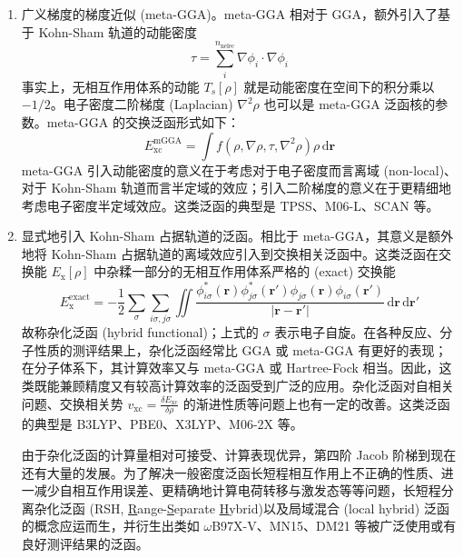 \begin{enumerate}[nosep]
  \item 广义梯度的梯度近似 (meta-GGA)。meta-GGA 相对于 GGA，额外引入了基于 Kohn-Sham 轨道的动能密度
  \begin{equation*}
    \tau = \sum_i^{n_\mathrm{nelec}} \nabla \phi_i \cdot \nabla \phi_i
  \end{equation*}
  事实上，无相互作用体系的动能 $T_s[\rho]$ 就是动能密度在空间下的积分乘以 $-1/2$。电子密度二阶梯度 (Laplacian) $\nabla^2 \rho$ 也可以是 meta-GGA 泛函核的参数。meta-GGA 的交换泛函形式如下：
  \begin{equation}
    E_\mathrm{xc}^\mathrm{mGGA} = \int f(\rho, \nabla \rho, \tau, \nabla^2 \rho) \rho \, \mathrm{d} \bm{r}
  \end{equation}
  meta-GGA 引入动能密度的意义在于考虑对于电子密度而言离域 (non-local)、对于 Kohn-Sham 轨道而言半定域的效应；引入二阶梯度的意义在于更精细地考虑电子密度半定域效应。这类泛函的典型是 TPSS\cite{Tao-Scuseria.PRL.2003, Perdew-Scuseria.JCP.2004}、M06-L\cite{Zhao-Truhlar.TCA.2008}、SCAN\cite{Sun-Perdew.PRL.2015} 等。

  \item 显式地引入 Kohn-Sham 占据轨道的泛函。相比于 meta-GGA，其意义是额外地将 Kohn-Sham 占据轨道的离域效应引入到交换相关泛函中。这类泛函在交换能 $E_\mathrm{x} [\rho]$ 中杂糅一部分的无相互作用体系严格的 (exact) 交换能
  \begin{equation}
    E_\mathrm{x}^\mathrm{exact} = - \frac{1}{2} \sum_\sigma \sum_{i\sigma, j\sigma} \iint \frac{\phi_{i\sigma}^* (\bm{r}) \phi_{j\sigma}^* (\bm{r}') \phi_{j\sigma} (\bm{r}) \phi_{i\sigma} (\bm{r}')}{|\bm{r} - \bm{r}'|} \, \mathrm{d} \bm{r} \, \mathrm{d} \bm{r}'
  \end{equation}
  故称杂化泛函 (hybrid functional)；上式的 $\sigma$ 表示电子自旋。在各种反应、分子性质的测评结果上，杂化泛函经常比 GGA 或 meta-GGA 有更好的表现；在分子体系下，其计算效率又与 meta-GGA 或 Hartree-Fock 相当。因此，这类既能兼顾精度又有较高计算效率的泛函受到广泛的应用。杂化泛函对自相关问题、交换相关势 $v_\mathrm{xc} = \frac{\delta E_\mathrm{xc}}{\delta \rho}$ 的渐进性质等问题上也有一定的改善。这类泛函的典型是 B3LYP\cite{Becke-Becke.JCP.1993, Stephens-Frisch.JPC.1994}、PBE0\cite{Adamo-Barone.JCP.1999, Ernzerhof-Scuseria.JCP.1999}、X3LYP\cite{Xu-Goddard.PNAS.2004}、M06-2X\cite{Zhao-Truhlar.TCA.2008} 等。
  
  由于杂化泛函的计算量相对可接受、计算表现优异，第四阶 Jacob 阶梯到现在还有大量的发展。为了解决一般密度泛函长短程相互作用上不正确的性质、进一减少自相互作用误差、更精确地计算电荷转移与激发态等等问题，长短程分离杂化泛函 (RSH, \underline{R}ange-\underline{S}eparate \underline{H}ybrid)\cite{Iikura-Hirao.JCP.2001}以及局域混合 (local hybrid) 泛函\cite{Jaramillo-Ernzerhof.JCP.2003}的概念应运而生，并衍生出类如 $\omega$B97X-V\cite{Mardirossian-Head-Gordon.PCCP.2014}、MN15\cite{Yu-Truhlar.CS.2016}、DM21\cite{Kirkpatrick-Cohen.S.2021} 等被广泛使用或有良好测评结果的泛函。


\end{enumerate}
